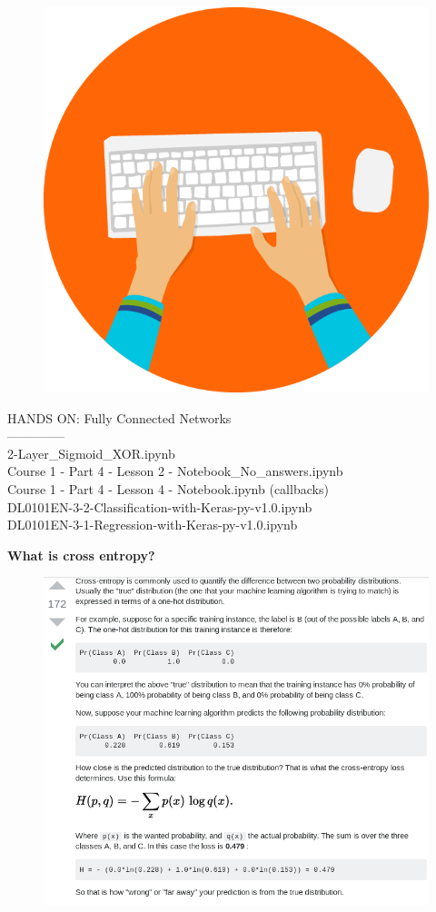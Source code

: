 \documentclass[10pt, compress]{beamer}
\begin{document}
\begin{frame}
  \vspace{.5cm}
  \begin{figure}
    \includegraphics[width=.2\linewidth, left]{imgs/hands_on_1}
  \end{figure}
  HANDS ON: Fully Connected Networks \\
  -------------- \\
  2-Layer{\_}Sigmoid{\_}XOR.ipynb \\
  Course 1 - Part 4 - Lesson 2 - Notebook{\_}No{\_}answers.ipynb \\
  Course 1 - Part 4 - Lesson 4 - Notebook.ipynb (callbacks) \\
  DL0101EN-3-2-Classification-with-Keras-py-v1.0.ipynb \\
  DL0101EN-3-1-Regression-with-Keras-py-v1.0.ipynb
\end{frame}

\begin{frame}
  \vspace{.6cm}
  \textbf{What is cross entropy?} \\
  \begin{figure}
    \includegraphics[width=.8\linewidth, left]{imgs/cross_entropy_1}
  \end{figure}
\end{frame}
\end{document}
